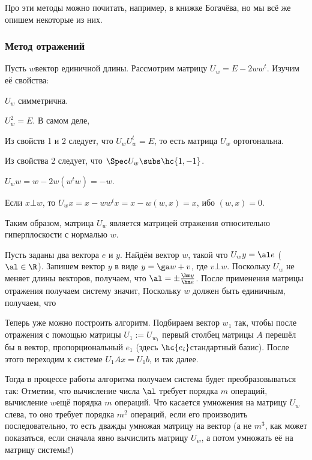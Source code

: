 \documentclass[a4paper]{article}
\begin{document}
Про эти методы можно почитать, например, в книжке Богачёва, но мы всё же опишем некоторые из них.


\subsubsection{Метод отражений}

Пусть $w$\т вектор единичной длины. Рассмотрим матрицу $U_w = E - 2ww^t$.
Изучим её свойства:
\begin{nums}{-2}
\item $U_w$ симметрична.
\item $U_w^2 = E$. В самом деле,
\item Из свойств 1 и 2 следует, что $U_w U_w^t = E$, то есть матрица $U_w$ ортогональна.
\item Из свойства 2 следует, что $\Spec U_w \subs \hc{1, -1}$.
\item $U_w w = w - 2 w(w^t w) = - w$.
\item Если $x \bot w$, то $U_w x = x - w w^t x = x - w (w,x) = x$, ибо $(w,x) = 0$.
\end{nums}

Таким образом, матрица $U_w$ является матрицей отражения
относительно гиперплоскости с нормалью $w$.

Пусть заданы два вектора $e$ и $y$. Найдём вектор $w$, такой что $U_w y = \al e$ ($\al \in \R$).
Запишем вектор $y$ в виде $y = \ga w + v$, где $v \bot w$. Поскольку $U_w$ не меняет длины векторов,
получаем, что $\al = \pm\frac{\hm y}{\hm e}$.
После применения матрицы отражения получаем систему
значит,
Поскольку $w$ должен быть единичным, получаем, что

Теперь уже можно построить алгоритм. Подбираем вектор $w_1$ так, чтобы после отражения
с помощью матрицы $U_1 := U_{w_1}$ первый столбец
матрицы $A$ перешёл бы в вектор, пропорциональный $e_1$ (здесь $\hc{e_i}$\т стандартный базис).
После этого переходим к системе $U_1 A x = U_1b$, и так далее.

Тогда в процессе работы алгоритма получаем система будет преобразовываться так:
Отметим, что вычисление числа $\al$ требует порядка $m$ операций, вычисление $w$\т ещё порядка $m$ операций.
Что касается умножения на матрицу $U_w$ слева, то оно требует порядка $m^2$ операций, если его производить последовательно,
то есть дважды умножая матрицу на вектор (а не $m^3$, как может показаться, если сначала явно вычислить матрицу $U_w$,
а потом умножать её на матрицу системы!)
\end{document}

